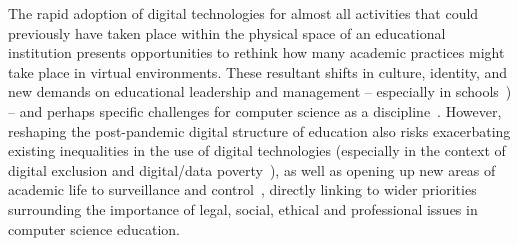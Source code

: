\documentclass[conference]{IEEEtran}
\begin{document}

The rapid adoption of digital technologies for almost all activities
that could previously have taken place within the physical space of an
educational institution presents opportunities to rethink how many
academic practices might take place in virtual environments. These
resultant shifts in culture, identity, and new demands on educational
leadership and management -- especially in
schools~\cite{slameditorial:2020}) -- and perhaps specific challenges
for computer science as a
discipline~\cite{crick-et-al:ukicer2020}. However, reshaping the
post-pandemic digital structure of education also risks exacerbating
existing inequalities in the use of digital technologies (especially
in the context of digital exclusion and digital/data
poverty~\cite{watts:2020,beaunoyer-et-al:2020}), as well as opening up
new areas of academic life to surveillance and
control~\cite{carriganlseblog:2020,williamson-et-al:2020}, directly linking to wider
priorities surrounding the importance of legal, social, ethical and
professional issues in computer science education.
\end{document}
